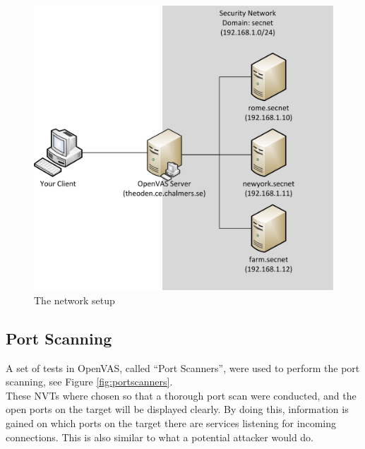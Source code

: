


\begin{figure}[hbt]
  \centering
  \includegraphics[scale=.4]{figures/setup.png}
  \caption{The network setup} \label{fig:setup}
\end{figure}



\subsection{Port Scanning}
\label{sub:port_set}

A set of tests in OpenVAS, called “Port Scanners”, were used to perform the port scanning, see Figure \ref{fig:portscanners}. \\

\noindent These NVTs where chosen so that a thorough port scan were conducted, and the open ports on the target will be displayed clearly. By doing this, information is gained on which ports on the target there are services listening for incoming connections. This is also similar to what a potential attacker would do.

